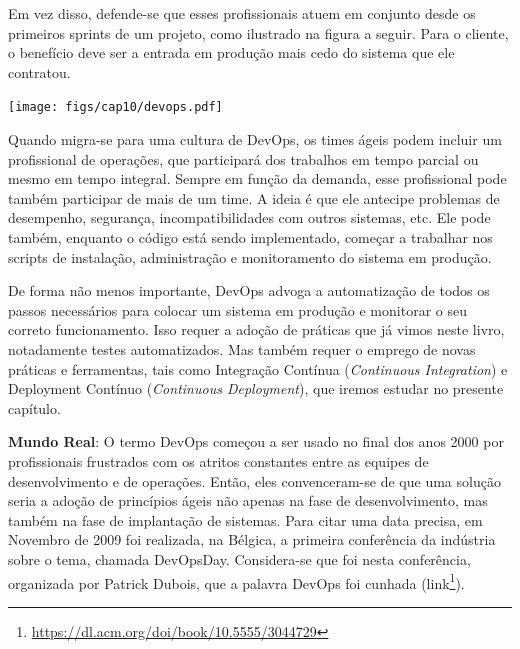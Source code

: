 \documentclass[
  11pt,
  twoside]{book}
\DeclareRobustCommand{\href}[2]{#2\footnote{\url{#1}}}
\newenvironment{esmbox}{\centering \vspace{1.5ex} \begin{tcolorbox}[breakable, colback=backcolor, width=4.9in]}{\end{tcolorbox} \vspace{1.5ex}}
\let\origfigure\figure
\let\endorigfigure\endfigure
\renewenvironment{figure}[1][2] {
    \expandafter\origfigure\expandafter[!h]
} {
    \endorigfigure
}
\begin{document}
Em vez disso, defende-se que esses profissionais atuem em conjunto desde
os primeiros sprints de um projeto, como ilustrado na figura a seguir.
Para o cliente, o benefício deve ser a entrada em produção mais cedo do
sistema que ele contratou.

\begin{figure}
\centering
\texttt{[image: figs/cap10/devops.pdf]}
\caption{Organização baseada em DevOps. Frequentemente, Devs e Ops
sentam juntos para discutir questões sobre a entrega do sistema.}
\end{figure}

Quando migra-se para uma cultura de DevOps, os times ágeis podem incluir
um profissional de operações, que participará dos trabalhos em tempo
parcial ou mesmo em tempo integral. Sempre em função da demanda, esse
profissional pode também participar de mais de um time. A ideia é que
ele antecipe problemas de desempenho, segurança, incompatibilidades com
outros sistemas, etc. Ele pode também, enquanto o código está sendo
implementado, começar a trabalhar nos scripts de instalação,
administração e monitoramento do sistema em produção.

De forma não menos importante, DevOps advoga a automatização de todos os
passos necessários para colocar um sistema em produção e monitorar o seu
correto funcionamento. Isso requer a adoção de práticas que já vimos
neste livro, notadamente testes automatizados. Mas também requer o
emprego de novas práticas e ferramentas, tais como Integração Contínua
(\emph{Continuous Integration}) e Deployment Contínuo (\emph{Continuous
Deployment}), que iremos estudar no presente capítulo.


\begin{esmbox}

\textbf{Mundo Real}: O termo DevOps começou a ser usado no final dos
anos 2000 por profissionais frustrados com os atritos constantes entre
as equipes de desenvolvimento e de operações. Então, eles convenceram-se
de que uma solução seria a adoção de princípios ágeis não apenas na fase
de desenvolvimento, mas também na fase de implantação de sistemas. Para
citar uma data precisa, em Novembro de 2009 foi realizada, na Bélgica, a
primeira conferência da indústria sobre o tema, chamada DevOpsDay.
Considera-se que foi nesta conferência, organizada por Patrick Dubois,
que a palavra DevOps foi cunhada
(\href{https://dl.acm.org/doi/book/10.5555/3044729}{link}).

\end{esmbox}
\end{document}
